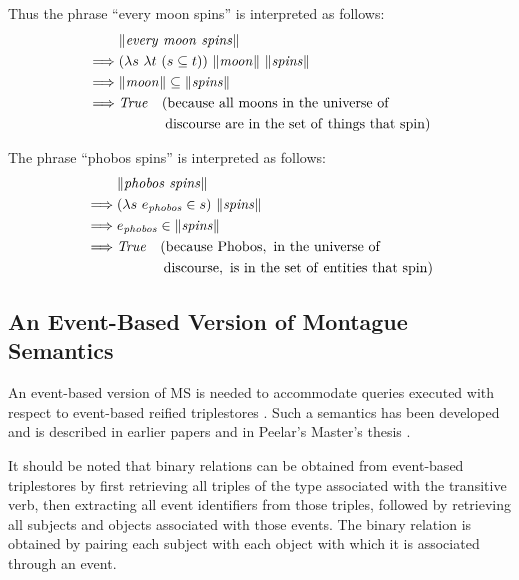 \documentclass[../main.tex]{subfiles}
\begin{document}
\begin{refsection}
Thus the phrase ``every moon spins'' is interpreted as follows:
\begin{equation*}
	\begin{split}
		&\meaningof{\every \ \moon \ \spins}\\
		\implies& (\lambda s \ \lambda t \ (s \subseteq t)) \ \meaningof{moon} \ \meaningof{\spins} \\
		\implies& \meaningof{moon}  \subseteq  \meaningof{\spins} \\
		\implies& \True \quad (\mathrm{because\ all\ moons\ in\ the\ universe\ of} \\
		&\mathrm{\quad\qquad\ discourse\ are\ in\ the\ set\ of\ things\ that\ spin}) \\
	\end{split}
\end{equation*}

The phrase ``phobos spins'' is interpreted as follows:
\begin{equation*}
	\begin{split}
		&\meaningof{\phobos \ \spins}\\
		\implies& (\lambda s \ \entityassoc{\phobos} \in s) \ \meaningof{spins}\\
		\implies& \entityassoc{\phobos} \in  \meaningof{spins} \\
		\implies& \True \quad (\mathrm{because\ Phobos,\ in\ the\ universe\ of} \\
		&\mathrm{\quad\qquad\ discourse,\ is\ in\ the\ set\ of\ entities\ that\ spin})
	\end{split}
\end{equation*}
\subsection{An Event-Based Version of Montague Semantics}
\label{icsc2020conf:evflms}
An event-based version of MS is needed to accommodate queries executed with respect to event-based reified triplestores \cite{graphmqslide}. Such a semantics has been developed and is described in
earlier papers \cite{graphmqslide, frost2014demonstration} and in Peelar's Master's thesis \cite{peelar2016accommodating}.

It should be noted that binary relations can be obtained from event-based triplestores by first retrieving
all triples of the type associated with the transitive verb, then extracting all event identifiers from those
triples, followed by retrieving all subjects and objects associated with those events. The binary relation
is obtained by pairing each subject with each object with which it is associated through an event.


\end{refsection}
\end{document}
